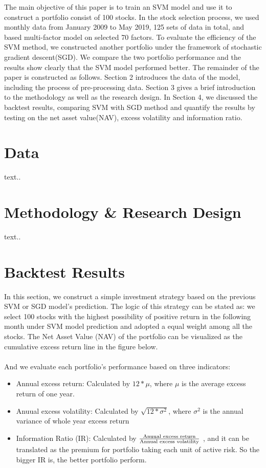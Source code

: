 \documentclass[12pt]{article}
\begin{document}
The main objective of this paper is to train an SVM model and use it to construct a portfolio consist of 100 stocks. In the stock selection process, we used monthly data from January 2009 to May 2019, 125 sets of data in total,  and based multi-factor model on selected 70 factors. To evaluate the efficiency of the SVM method, we constructed another portfolio under the framework of stochastic gradient descent(SGD). We compare the two portfolio performance and the results show clearly that the SVM model performed better. The remainder of the paper is constructed as follows. Section 2 introduces the data of the model, including the process of pre-processing data. Section 3 gives a brief introduction to the methodology as well as the research design. In Section 4, we discussed the backtest results, comparing SVM with SGD method and quantify the results by testing on the net asset value(NAV), excess volatility and information ratio.\\
		
\section{Data}
text..


\section{Methodology \& Research Design}
text..

\newpage
\section{Backtest Results}

In this section, we construct a simple investment strategy based on the previous SVM or SGD model's prediction. The logic of this strategy can be stated as: we select 100 stocks with the highest possibility of positive return in the following month under SVM model prediction and adopted a equal weight among all the stocks. The Net Asset Value (NAV) of the portfolio can be visualized as the cumulative excess return line in the figure below.\\ \\

\noindent And we evaluate each portfolio's performance based on three indicators:
	\begin{itemize}
		\item Annual excess return: Calculated by $12*\mu$, where $\mu$ is the average excess return of one year.
		\item Anuual excess volatility: Calculated by $\sqrt{12 * \sigma^2}$, where $\sigma^2$ is the annual variance of whole year excess return 
		\item Information Ratio (IR): Calculated by $\frac{\textnormal{Anuual excess return}}{\textnormal{Annual excess volatility}}$ , and it can be translated as the premium for portfolio taking each unit of active risk. So the bigger IR is, the better portfolio perform.
	\end{itemize}
\end{document}
